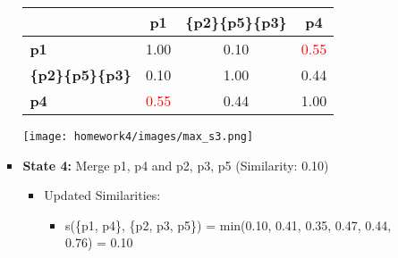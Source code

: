 \documentclass[11pt]{article}
\begin{document}
\begin{enumerate}
\begin{enumerate}
\begin{itemize}
\begin{table}[H]
        \centering
        \begin{minipage}{0.75\textwidth}  %
            \centering
            \begin{minipage}{0.4\textwidth}
                \centering
                \label{tb:exp1}
                \begin{tabular}{ l| c | c | c}\hline
                           & \textbf{p1} & \textbf{\{p2\}}\textbf{\{p5\}}\textbf{\{p3\}} & \textbf{p4} \\ \hline
                    \bf p1                 & 1.00       & 0.10        & \textcolor{red}{0.55}  \\
                    \bf \{p2\}\{p5\}\{p3\} & 0.10        & 1.00        & 0.44                           \\
                    \bf p4                 & \textcolor{red}{0.55}        & 0.44        & 1.00               \\
                    \hline
                \end{tabular}
            \end{minipage}%
            \hfill
            \begin{minipage}{0.28\textwidth}
                \centering
                \texttt{[image: homework4/images/max\_s3.png]}
                \label{fig:your-image}
            \end{minipage}
        \end{minipage}
    \end{table}

            \item \textbf{State 4:} Merge {p1, p4} and {p2, p3, p5} (Similarity: 0.10)

        \begin{itemize}
        \item Updated Similarities:
        \begin{itemize}
            \item s(\{p1, p4\}, \{p2, p3, p5\}) = min(0.10, 0.41, 0.35, 0.47, 0.44, 0.76) = 0.10
        \end{itemize}
    \end{itemize}
    

\end{itemize}
\end{enumerate}
\end{enumerate}
\end{document}
